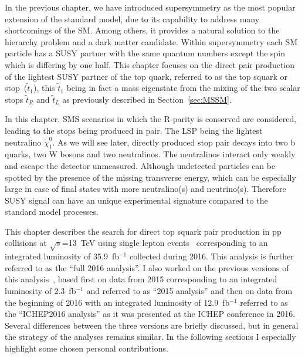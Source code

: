 \clearpage

\setcounter{secnumdepth}{4}
\setcounter{secnumdepth}{4}


In the previous chapter, we have introduced  supersymmetry as the most popular extension of the standard model, due to its capability to address many shortcomings of the SM. Among others, it provides a natural solution to the hierarchy problem and a dark matter candidate. Within supersymmetry each SM particle has a SUSY partner with the same quantum numbers except the spin which is differing by one half. This chapter focuses on the direct pair production of the lightest SUSY partner of the top quark, referred to as the top squark or stop~($\tilde{t}_{1}$), this $\tilde{t}_{1}$ being in fact a mass eigenstate  from the mixing of the two scalar stops $\tilde{t}_{R}$ and  $\tilde{t}_{L}$ as previously described in Section~\ref{sec:MSSM}.


In this chapter, SMS scenarios in which the R-parity is conserved are considered, leading to  the stops being produced in pair. The LSP being the lightest neutralino $\tilde{\chi}^{0}_{1}$. As we will see later, directly produced stop pair decays into two b quarks, two W bosons and two neutralinos. The neutralinos interact only weakly and escape the detector unmeasured. Although undetected particles can be spotted by the presence of the missing transverse energy, which can be especially large in case of final states with more neutralino(s) and neutrino(s). Therefore SUSY signal can have an unique experimental signature compared to the standard model processes.

This chapter describes the search for direct top squark pair production in pp collisions at $\sqrt{s}$=13~TeV using single lepton events~\cite{Sirunyan:2017xse} corresponding to an integrated luminosity of 35.9~fb$^{-1}$ collected during 2016. This analysis is further referred to as the ``full 2016 analysis''.  I also worked on the previous versions of this analysis~\cite{Sirunyan:2016jpr, CMS:2016vew}, based first on data from 2015 corresponding to an integrated luminosity of 2.3~fb$^{-1}$ and referred to as ``2015 analysis'' and then on data from the beginning of 2016 with an integrated luminosity of 12.9~fb$^{-1}$ referred to as the ``ICHEP2016 analysis'' as it was presented at the ICHEP conference in 2016. Several differences between the three versions are briefly discussed, but in general the strategy of the analyses remains similar. In the following sections I especially highlight some chosen personal contributions.

